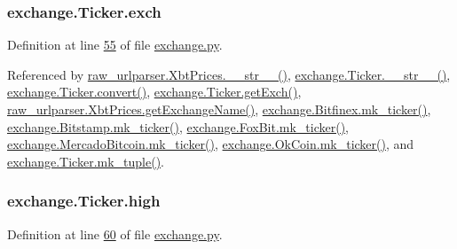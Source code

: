 \subsubsection[{\texorpdfstring{exch}{exch}}]{\setlength{\rightskip}{0pt plus 5cm}exchange.\+Ticker.\+exch}\hypertarget{classexchange_1_1_ticker_a33f33fe9a12da3ce52938afdc577c061}{}\label{classexchange_1_1_ticker_a33f33fe9a12da3ce52938afdc577c061}


Definition at line \hyperlink{exchange_8py_source_l00055}{55} of file \hyperlink{exchange_8py_source}{exchange.\+py}.



Referenced by \hyperlink{raw__urlparser_8py_source_l00074}{raw\+\_\+urlparser.\+Xbt\+Prices.\+\_\+\+\_\+str\+\_\+\+\_\+()}, \hyperlink{exchange_8py_source_l00111}{exchange.\+Ticker.\+\_\+\+\_\+str\+\_\+\+\_\+()}, \hyperlink{exchange_8py_source_l00065}{exchange.\+Ticker.\+convert()}, \hyperlink{exchange_8py_source_l00087}{exchange.\+Ticker.\+get\+Exch()}, \hyperlink{raw__urlparser_8py_source_l00068}{raw\+\_\+urlparser.\+Xbt\+Prices.\+get\+Exchange\+Name()}, \hyperlink{exchange_8py_source_l00346}{exchange.\+Bitfinex.\+mk\+\_\+ticker()}, \hyperlink{exchange_8py_source_l00415}{exchange.\+Bitstamp.\+mk\+\_\+ticker()}, \hyperlink{exchange_8py_source_l00474}{exchange.\+Fox\+Bit.\+mk\+\_\+ticker()}, \hyperlink{exchange_8py_source_l00549}{exchange.\+Mercado\+Bitcoin.\+mk\+\_\+ticker()}, \hyperlink{exchange_8py_source_l00614}{exchange.\+Ok\+Coin.\+mk\+\_\+ticker()}, and \hyperlink{exchange_8py_source_l00096}{exchange.\+Ticker.\+mk\+\_\+tuple()}.

\subsubsection[{\texorpdfstring{high}{high}}]{\setlength{\rightskip}{0pt plus 5cm}exchange.\+Ticker.\+high}\hypertarget{classexchange_1_1_ticker_aace381ca15468df6a40e8d86b7710a7f}{}\label{classexchange_1_1_ticker_aace381ca15468df6a40e8d86b7710a7f}


Definition at line \hyperlink{exchange_8py_source_l00060}{60} of file \hyperlink{exchange_8py_source}{exchange.\+py}.



